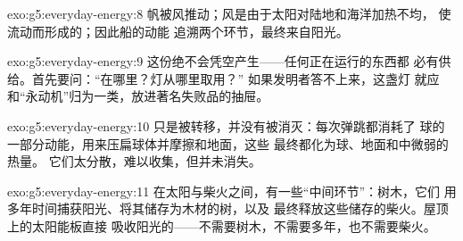 \begin{solution}{exo:g5:everyday-energy:8}
帆被风推动；风是由于太阳对陆地和海洋加热不均，
使流动而形成的；因此船的动能
追溯两个环节，最终来自阳光。
\end{solution}

\begin{solution}{exo:g5:everyday-energy:9}
这份绝不会凭空产生——任何正在运行的东西都
必有供给。首先要问：“在哪里？灯从哪里取用？”
如果发明者答不上来，这盏灯
就应和“永动机”归为一类，放进著名失败品的抽屉。
\end{solution}

\begin{solution}{exo:g5:everyday-energy:10}
只是被转移，并没有被消灭：每次弹跳都消耗了
球的一部分动能，用来压扁球体并摩擦和地面，这些
最终都化为球、地面和中微弱的热量。
它们太分散，难以收集，但并未消失。
\end{solution}

\begin{solution}{exo:g5:everyday-energy:11}
在太阳与柴火之间，有一些“中间环节”：树木，它们
用多年时间捕获阳光、将其储存为木材的树，以及
最终释放这些储存的柴火。屋顶上的太阳能板直接
吸收阳光的——不需要树木，不需要多年，也不需要柴火。
\end{solution}

